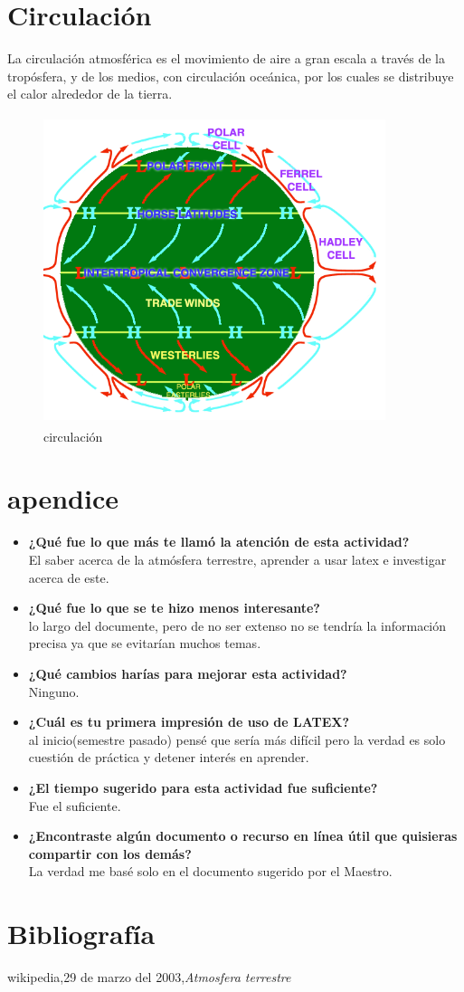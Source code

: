 \documentclass{article}
\begin{document}
\section{Circulación}
La circulación atmosférica es el movimiento de aire a gran escala a través de la tropósfera, y de los medios, con circulación oceánica, por los cuales se distribuye el calor alrededor de la tierra.\\
\begin{figure}[h!]
\centering
\includegraphics[width=10.0cm,height=9.0cm]{circulacion.png}
\caption{circulación}
\end{figure}
\section{apendice}
\begin{itemize}
\item\textbf{¿Qué fue lo que más te llamó la atención de esta actividad?}\\
El saber acerca de la atmósfera terrestre, aprender a usar latex e investigar acerca de este.
\item\textbf{¿Qué fue lo que se te hizo menos interesante?}\\
lo largo del documente, pero de no ser extenso no se tendría la información precisa ya que se evitarían muchos temas.
\item\textbf{¿Qué cambios harías para mejorar esta actividad?}\\
Ninguno.
\item\textbf{¿Cuál es tu primera impresión de uso de LATEX?}\\
al inicio(semestre pasado) pensé que sería más difícil pero la verdad es solo cuestión de práctica y detener interés en aprender.
\item\textbf{¿El tiempo sugerido para esta actividad fue suficiente? }\\
Fue el suficiente.
\item\textbf{¿Encontraste algún documento o recurso en línea útil que quisieras compartir con los demás?}\\
La verdad me basé solo en el documento sugerido por el Maestro.
\end{itemize}
\section{Bibliografía}
wikipedia,29 de marzo del 2003,\textit{Atmosfera terrestre}
\end{document}
